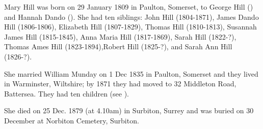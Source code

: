 
Mary Hill was born on 29 January 1809  in Paulton, Somerset, to  George Hill () and Hannah Dando ().\cite{MaryHillBirthDeath}  She had ten siblings:  John Hill (1804-1871), James Dando Hill (1806-1806), Elizabeth Hill (1807-1829), Thomas Hill (1810-1813), Susannah James Hill (1815-1845), Anna Maria Hill (1817-1869), Sarah Hill (1822-?), Thomas Ames Hill (1823-1894),Robert Hill (1825-?), and Sarah Ann Hill (1826-?).

She married William Munday on 1 Dec 1835 in Paulton, Somerset and they lived in Warminster, Wiltshire; by 1871 they had moved to 32 Middleton Road, Battersea. \cite{MHillResidence} They had ten children (see ).

She died on 25 Dec. 1879 (at 4.10am) in Surbiton, Surrey and was buried on 30 December at Norbiton Cemetery, Surbiton. \cite{MaryHillBirthDeath}

